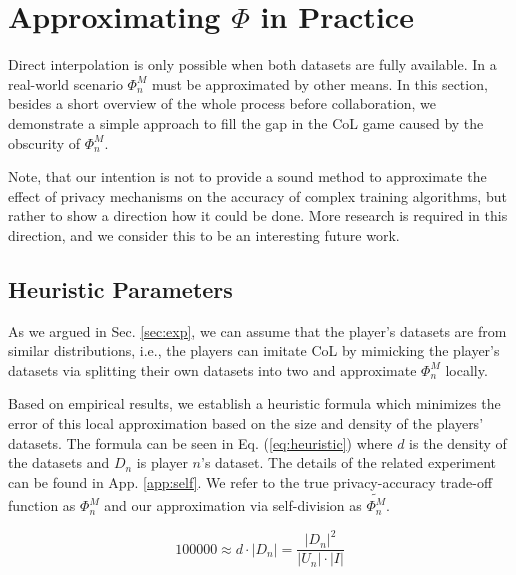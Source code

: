 \documentclass[USenglish,oneside,twocolumn]{article}
\theoremstyle{plain}
\begin{document}
    \section{Approximating $\Phi$ in Practice}
    \label{sec:approx}
    \vspace{-0.25cm}
    
    Direct interpolation is only possible when both datasets are fully available. In a real-world scenario $\Phi^M_n$ must be approximated by other means. In this section, besides a short overview of the whole process before collaboration, we demonstrate a simple approach to fill the gap in the CoL game caused by the obscurity of $\Phi^M_n$. 
    
    Note, that our intention is not to provide a sound method to approximate the effect of privacy mechanisms on the accuracy of complex training algorithms, but rather to show a direction how it could be done. More research is required in this direction, and we consider this to be an interesting future work.
    
    \vspace{-0.5cm}
    \subsection{Heuristic Parameters}
    \vspace{-0.25cm}
    
    As we argued in Sec. \ref{sec:exp}, we can assume that the player's datasets are from similar distributions, i.e., the players can imitate CoL by mimicking the player's datasets via splitting their own datasets into two and approximate $\Phi_n^M$ locally. 
    
    Based on empirical results, we establish a heuristic formula which minimizes the error of this local approximation based on the size and density of the players' datasets. The formula can be seen in Eq. (\ref{eq:heuristic}) where $d$ is the density of the datasets and $D_n$ is player $n$'s dataset. The details of the related experiment can be found in App. \ref{app:self}. We refer to the true privacy-accuracy trade-off function as $\Phi_n^M$ and our approximation via self-division as $\widetilde{\Phi_n^M}$.
    
    \vspace{-0.25cm}
    \begin{equation}
    \label{eq:heuristic}
    \num{100000}\approx d\cdot|D_n|=\frac{|D_n|^2}{|U_n|\cdot|I|}
    \end{equation}
    
\end{document}
